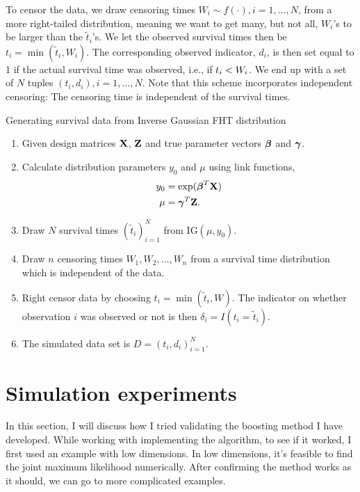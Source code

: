 To censor the data, we draw censoring times $W_i\sim f(\cdot),i=1,\ldots,N$, from a more right-tailed distribution, meaning we want to get many, but not all, $W_i$'s to be larger than the $\tilde{t}_i$'s. We let the observed survival times then be $t_i=\min(\tilde{t}_i,W_i)$.
The corresponding observed indicator, $d_i$, is then set equal to 1 if the actual survival time was observed, i.e., if $t_{i}<W_i$. We end up with a set of $N$ tuples $(t_i,d_i),i=1,\ldots,N$. Note that this scheme incorporates independent censoring: The censoring time is independent of the survival times.

\begin{algorithm}
\caption{Generating survival data from Inverse Gaussian FHT distribution}
\label{algo:FHT-sim}
\begin{enumerate}
    \item Given design matrices $\mathbf{X}$, $\mathbf{Z}$ and true parameter vectors $\boldsymbol{\beta}$ and $\boldsymbol{\gamma}$.
    \item Calculate distribution parameters $y_0$ and $\mu$ using link functions,
        \begin{align*}
            y_0&=\exp(\boldsymbol{\beta}^T\mathbf{X}) \\
            \mu&=\boldsymbol{\gamma}^T\mathbf{Z}.
        \end{align*}
    \item Draw $N$ survival times $(\tilde{t}_i)_{i=1}^N$ from IG$(\mu,y_0)$.
    \item Draw $n$ censoring times $W_1,W_2,\ldots,W_n$ from a survival time distribution which is independent of the data.
    \item Right censor data by choosing $t_i=\min(\tilde{t}_i,W)$. The indicator on whether observation $i$ was observed or not is then $\delta_i=I(t_i=\tilde{t}_i)$.
    \item The simulated data set is $D=(t_i,d_i)_{i=1}^N$.
\end{enumerate}
\end{algorithm}

\section{Simulation experiments}
In this section, I will discuss how I tried validating the boosting method I have developed. While working with implementing the algorithm, to see if it worked, I first used an example with low dimensions. In low dimensions, it's feasible to find the joint maximum likelihood numerically. After confirming the method works as it should, we can go to more complicated examples.

